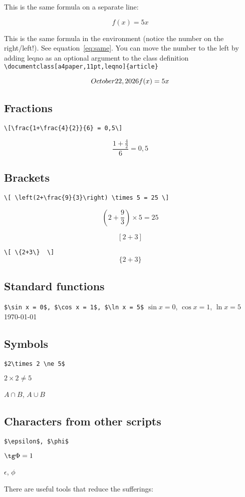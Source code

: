 \documentclass[a4paper,11pt,leqno]{article}
\begin{document}
This is the same formula on a separate line:

\[ f(x)=5x \]

This is the same formula in the environment (notice the number on the right/left!). See equation~\ref{eq:same}. You can move the number to the left by adding leqno as an optional argument to the class definition \verb|\documentclass[a4paper,11pt,leqno]{article}| 

\begin{equation}\label{eq:same}\today
f(x)=5x
\end{equation}

\subsection{Fractions}
\verb|\[\frac{1+\frac{4}{2}}{6} = 0,5\]|

\[\frac{1+\frac{4}{2}}{6} = 0,5\]

\subsection{Brackets}
\verb|\[ \left(2+\frac{9}{3}\right) \times 5 = 25 \]|

\[ \left(2+\frac{9}{3}\right) \times 5 = 25 \]

\[  [2+3]  \]

\verb|\[ \{2+3\}  \]|
\[ \{2+3\}  \]

\subsection{Standard functions}
\verb|$\sin x = 0$, $\cos x = 1$, $\ln x = 5$|
$\sin x = 0$, $\cos x = 1$, $\ln x = 5$\today

\subsection{Symbols}
\verb|$2\times 2 \ne 5$|

$2\times 2 \ne 5$

$A \cap B$, $A \cup B$

\subsection{Characters from other scripts}
\verb|$\epsilon$, $\phi$|

$\tg \Phi = 1$

$\epsilon$, $\phi$

\bigskip

There are useful tools that reduce the sufferings:
\end{document}
